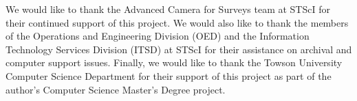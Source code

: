 \documentclass[11pt,twoside]{article}
\begin{document}

\acknowledgements We would like to thank the Advanced Camera for Surveys team at STScI for their continued support of this project. We would also like to thank the members of the Operations and Engineering Division (OED) and the Information Technology Services Division (ITSD) at STScI for their assistance on archival and computer support issues.  Finally,  we would like to thank the Towson University Computer Science Department for their support of this project as part of the author's Computer Science Master's Degree project.


\end{document}
